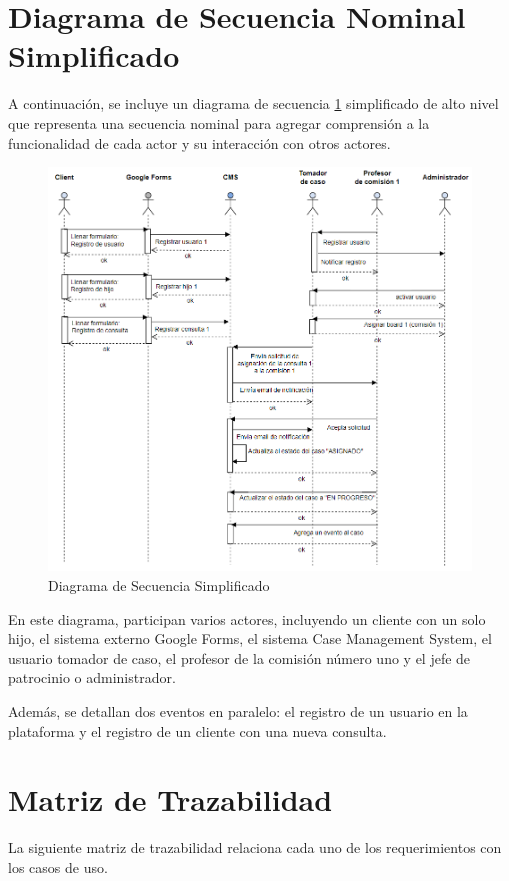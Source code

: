 \section{Diagrama de Secuencia Nominal Simplificado}
A continuación, se incluye un diagrama de secuencia \ref{fig:secuencia-nominal} simplificado de alto nivel que representa una secuencia nominal para agregar comprensión a la funcionalidad de cada actor y su interacción con otros actores.

\begin{figure}[H]
\centering
\includegraphics[width=1\linewidth]{fig/secuencia-basica.png}
\caption{Diagrama de Secuencia Simplificado}
\label{fig:secuencia-nominal}
\end{figure}

En este diagrama, participan varios actores, incluyendo un cliente con un solo hijo, el sistema externo Google Forms, el sistema Case Management System, el usuario tomador de caso, el profesor de la comisión número uno y el jefe de patrocinio o administrador.

Además, se detallan dos eventos en paralelo: el registro de un usuario en la plataforma y el registro de un cliente con una nueva consulta.

\section{Matriz de Trazabilidad}
La siguiente matriz de trazabilidad relaciona cada uno de los requerimientos con los casos de uso.


